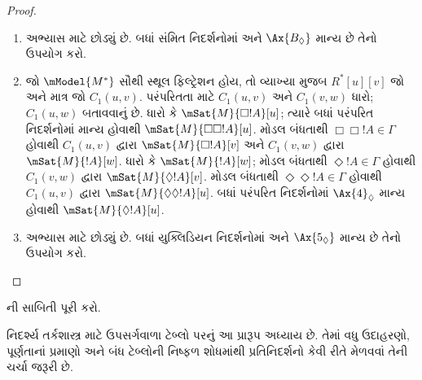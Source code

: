 \begin{proof}
\begin{enumerate}
  \item અભ્યાસ માટે છોડ્યું છે. બધાં સંમિત નિદર્શનોમાં
     અને $\Ax{B_\Diamond}$ માન્ય છે તેનો ઉપયોગ કરો.
  \item જો $\mModel{M^*}$ સૌથી સ્થૂલ ફિલ્ટ્રેશન હોય, તો વ્યાખ્યા
    મુજબ $R^*[u][v]$ જો અને માત્ર જો $C_1(u,v)$. પરંપરિતતા
    માટે $C_1(u,v)$ અને $C_1(v,w)$ ધારો; $C_1(u,w)$ બતાવવાનું છે.
    ધારો કે $\mSat{M}{\Box !A}[u]$; ત્યારે
      બધાં પરંપરિત નિદર્શનોમાં  માન્ય હોવાથી
      $\mSat{M}{\Box\Box!A}[u]$. મોડલ બંધતાથી
      $\Box\Box!A \in \Gamma$ હોવાથી $C_1(u,v)$ દ્વારા
      $\mSat{M}{\Box!A}[v]$ અને $C_1(v,w)$ દ્વારા
      $\mSat{M}{!A}[w]$. %
    ધારો કે $\mSat{M}{!A}[w]$; મોડલ
      બંધતાથી $\Diamond !A \in \Gamma$ હોવાથી $C_1(v,w)$
      દ્વારા $\mSat{M}{\Diamond !A}[v]$. મોડલ બંધતાથી
      $\Diamond\Diamond!A \in \Gamma$ હોવાથી $C_1(u,v)$
      દ્વારા $\mSat{M}{\Diamond\Diamond !A}[u]$. બધાં
      પરંપરિત નિદર્શનોમાં $\Ax{4}_\Diamond$ માન્ય હોવાથી
      $\mSat{M}{\Diamond!A}[u]$.
  \item અભ્યાસ માટે છોડ્યું છે. બધાં યુક્લિડિયન નિદર્શનોમાં
     અને $\Ax{5_\Diamond}$ માન્ય છે તેનો ઉપયોગ કરો.
\end{enumerate}
\end{proof}

\begin{prob}
  ની સાબિતી પૂરી કરો.
\end{prob}
\endgroup


\OLEndChapterHook
\endgroup


\begingroup
\makeatletter{}\makeatother

\label{guunit:OLP-0460}


\begin{editorial}
  નિદર્શ્ય તર્કશાસ્ત્ર માટે ઉપસર્ગવાળા ટેબ્લો પરનું આ પ્રારૂપ અધ્યાય છે.
  તેમાં વધુ ઉદાહરણો, પૂર્ણતાનાં પ્રમાણો અને બંધ ટેબ્લોની નિષ્ફળ
  શોધમાંથી પ્રતિનિદર્શનો કેવી રીતે મેળવવાં તેની ચર્ચા જરૂરી છે.
\end{editorial}

\begingroup
\makeatletter{}\makeatother

